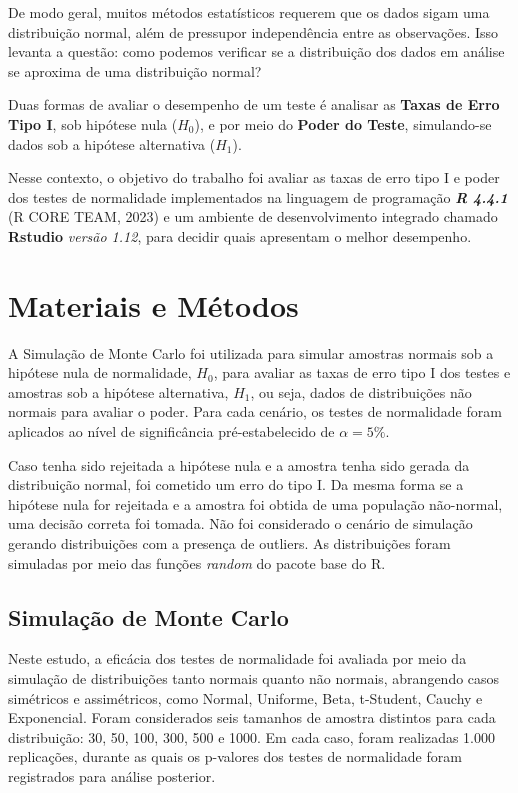 \documentclass[a4paper,11pt]{article} %
\begin{document}
De modo geral, muitos métodos estatísticos requerem que os dados sigam uma distribuição normal, além de pressupor independência entre as observações. Isso levanta a questão: como podemos verificar se a distribuição dos dados em análise se aproxima de uma distribuição normal?\vskip0.3cm


Duas formas de avaliar o desempenho de um teste é analisar as \textbf{Taxas de Erro Tipo I}, sob hipótese nula ($H_0$), e por meio do \textbf{Poder do Teste}, simulando-se dados sob a hipótese alternativa ($H_1$). \vskip0.3cm

Nesse contexto, o objetivo do trabalho foi avaliar as taxas de erro tipo I e poder dos testes de normalidade implementados na linguagem de programação \textbf{\textit{R 4.4.1}} (R CORE TEAM, 2023) e um ambiente de desenvolvimento integrado chamado \textbf{Rstudio} \textit{versão 1.12}, para decidir quais apresentam o melhor desempenho.


\section{Materiais e Métodos}
A Simulação de Monte Carlo foi utilizada para simular amostras normais sob a hipótese nula de normalidade, $H_0$, para avaliar as taxas de erro tipo I dos testes e amostras sob a hipótese alternativa, $H_1$, ou seja, dados de distribuições não normais para avaliar o poder. Para cada cenário, os testes de normalidade foram aplicados ao nível de significância pré-estabelecido de $\alpha = 5\%$. \vskip0.3cm

Caso tenha sido rejeitada a hipótese nula e a amostra tenha sido gerada da distribuição normal, foi cometido um erro do tipo I. Da mesma forma se a hipótese nula for rejeitada e a amostra foi obtida de uma população não-normal, uma decisão correta foi tomada. Não foi considerado o cenário de simulação gerando distribuições com a presença de outliers. As distribuições foram simuladas por meio das funções \textit{random} do pacote base do R.

\subsection{Simulação de Monte Carlo}
Neste estudo, a eficácia dos testes de normalidade foi avaliada por meio da simulação de distribuições tanto normais quanto não normais, abrangendo casos simétricos e assimétricos, como Normal, Uniforme, Beta, t-Student, Cauchy e Exponencial. Foram considerados seis tamanhos de amostra distintos para cada distribuição: 30, 50, 100, 300, 500 e 1000. Em cada caso, foram realizadas 1.000 replicações, durante as quais os p-valores dos testes de normalidade foram registrados para análise posterior. \vskip0.3cm
\end{document}
